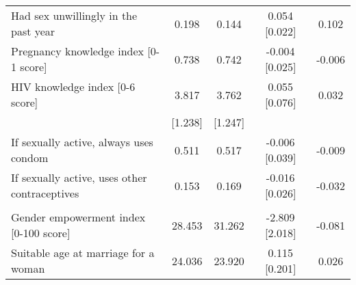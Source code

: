 \begin{table}[H]
{\begin{tabular}{lcccc}
\hspace{1em}Had sex unwillingly in the past year & 0.198 & 0.144 & 0.054 [0.022] & 0.102\\
\hspace{1em}Pregnancy knowledge index [0-1 score] & 0.738 & 0.742 & -0.004 [0.025] & -0.006\\
\hspace{1em}HIV knowledge index [0-6 score] & 3.817 & 3.762 & 0.055 [0.076] & 0.032\\
\hspace{1em} & [1.238] & [1.247] &  & \\
\hspace{1em}If sexually active, always uses condom & 0.511 & 0.517 & -0.006 [0.039] & -0.009\\
\hspace{1em}If sexually active, uses other contraceptives & 0.153 & 0.169 & -0.016 [0.026] & -0.032\\
\addlinespace[0.3em]
\multicolumn{5}{l}{\textbf{Panel D. Beliefs and aspirations}}\\
\hspace{1em}Gender empowerment index [0-100 score] & 28.453 & 31.262 & -2.809 [2.018] & -0.081\\
\hspace{1em}Suitable age at marriage for a woman & 24.036 & 23.920 & 0.115 [0.201] & 0.026\\
\bottomrule
\end{tabular}}
\end{table}
